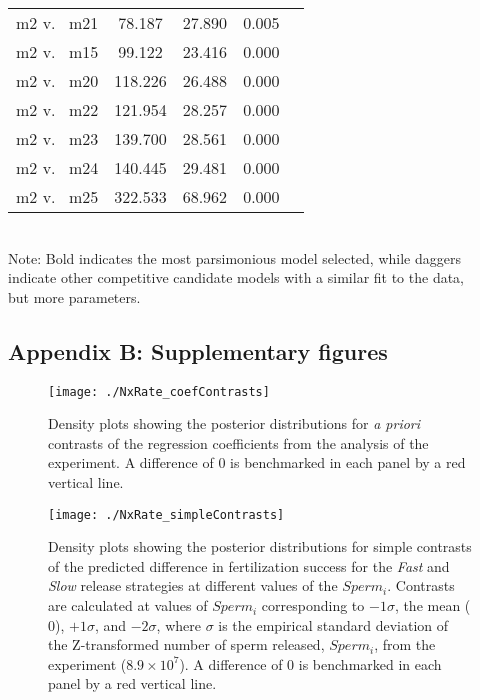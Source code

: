 \documentclass{article}
\begin{document}
\begin{table}[!ht]
\begin{tabular}{l c c c c}
m2 v.~ m21 & 78.187  & 27.890 & 0.005 \\
m2 v.~ m15 & 99.122  & 23.416 & 0.000 \\
m2 v.~ m20 & 118.226 & 26.488 & 0.000 \\
m2 v.~ m22 & 121.954 & 28.257 & 0.000 \\
m2 v.~ m23 & 139.700 & 28.561 & 0.000 \\
m2 v.~ m24 & 140.445 & 29.481 & 0.000 \\
m2 v.~ m25 & 322.533 & 68.962 & 0.000 \\
\hline
\end{tabular}
\smallskip{} \\
{\footnotesize Note: Bold indicates the most parsimonious model selected, while daggers \\indicate other competitive candidate models with a similar fit to the data, \\but more parameters.}
\end{table}










\newpage{}

\subsection*{Appendix B: Supplementary figures}
\renewcommand{\theequation}{S\arabic{equation}}
\setcounter{equation}{0}
\renewcommand{\thefigure}{S\arabic{figure}}
\setcounter{figure}{0}

\begin{figure}[!ht]
\texttt{[image: ./NxRate\_coefContrasts]}
\caption{Density plots showing the posterior distributions for \textit{a priori} contrasts of the regression coefficients from the analysis of the  experiment. A difference of 0 is benchmarked in each panel by a red vertical line.}
\label{fig:coefContr}
\end{figure}
\newpage{}



\begin{figure}[!ht]
\texttt{[image: ./NxRate\_simpleContrasts]}
\caption{Density plots showing the posterior distributions for simple contrasts of the predicted difference in fertilization success for the \textit{Fast} and \textit{Slow} release strategies at different values of the $Sperm_i$. Contrasts are calculated at values of $Sperm_i$ corresponding to $-1 \sigma$, the mean ($0$), $+1 \sigma$, and $-2 \sigma$, where $\sigma$ is the empirical standard deviation of the Z-transformed number of sperm released, $Sperm_i$, from the  experiment ($8.9 \times 10^{7}$). A difference of 0 is benchmarked in each panel by a red vertical line.}
\label{fig:simpContr}
\end{figure}
\newpage{}
\end{document}
